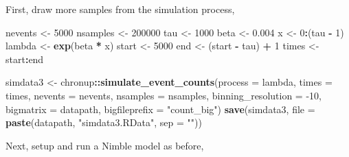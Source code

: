 \documentclass[]{article}
\newenvironment{Shaded}{\begin{snugshade}}{\end{snugshade}}
\newcommand{\KeywordTok}[1]{\textcolor[rgb]{0.13,0.29,0.53}{\textbf{#1}}}
\newcommand{\DataTypeTok}[1]{\textcolor[rgb]{0.13,0.29,0.53}{#1}}
\newcommand{\DecValTok}[1]{\textcolor[rgb]{0.00,0.00,0.81}{#1}}
\newcommand{\FloatTok}[1]{\textcolor[rgb]{0.00,0.00,0.81}{#1}}
\newcommand{\StringTok}[1]{\textcolor[rgb]{0.31,0.60,0.02}{#1}}
\newcommand{\OperatorTok}[1]{\textcolor[rgb]{0.81,0.36,0.00}{\textbf{#1}}}
\newcommand{\NormalTok}[1]{#1}
\begin{document}
First, draw more samples from the simulation process,

\begin{Shaded}
\begin{Highlighting}[]
\NormalTok{nevents <-}\StringTok{ }\DecValTok{5000}
\NormalTok{nsamples <-}\StringTok{ }\DecValTok{200000}
\NormalTok{tau <-}\StringTok{ }\DecValTok{1000}
\NormalTok{beta <-}\StringTok{ }\FloatTok{0.004}
\NormalTok{x <-}\StringTok{ }\DecValTok{0}\OperatorTok{:}\NormalTok{(tau }\OperatorTok{-}\StringTok{ }\DecValTok{1}\NormalTok{)}
\NormalTok{lambda <-}\StringTok{ }\KeywordTok{exp}\NormalTok{(beta }\OperatorTok{*}\StringTok{ }\NormalTok{x)}
\NormalTok{start <-}\StringTok{ }\DecValTok{5000}
\NormalTok{end <-}\StringTok{ }\NormalTok{(start }\OperatorTok{-}\StringTok{ }\NormalTok{tau) }\OperatorTok{+}\StringTok{ }\DecValTok{1}
\NormalTok{times <-}\StringTok{ }\NormalTok{start}\OperatorTok{:}\NormalTok{end}
\end{Highlighting}
\end{Shaded}

\begin{Shaded}
\begin{Highlighting}[]
\NormalTok{simdata3 <-}\StringTok{ }\NormalTok{chronup}\OperatorTok{::}\KeywordTok{simulate_event_counts}\NormalTok{(}\DataTypeTok{process =}\NormalTok{ lambda,}
                                            \DataTypeTok{times =}\NormalTok{ times,}
                                            \DataTypeTok{nevents =}\NormalTok{ nevents,}
                                            \DataTypeTok{nsamples =}\NormalTok{ nsamples,}
                                            \DataTypeTok{binning_resolution =} \DecValTok{-10}\NormalTok{,}
                                            \DataTypeTok{bigmatrix =}\NormalTok{ datapath,}
                                            \DataTypeTok{bigfileprefix =} \StringTok{"count_big"}\NormalTok{)}
\KeywordTok{save}\NormalTok{(simdata3,}
    \DataTypeTok{file =} \KeywordTok{paste}\NormalTok{(datapath,}
                \StringTok{"simdata3.RData"}\NormalTok{,}
                \DataTypeTok{sep =} \StringTok{""}\NormalTok{))}
\end{Highlighting}
\end{Shaded}

Next, setup and run a Nimble model as before,
\end{document}
